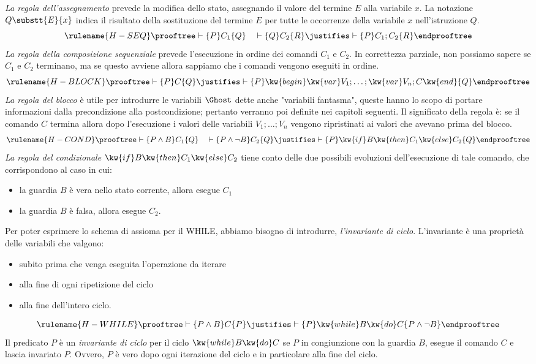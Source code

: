 \emph{La regola dell'assegnamento} prevede la modifica dello stato, assegnando il valore del termine $E$ alla variabile $x$.
La notazione $Q\substt{E}{x}$ indica il risultato della sostituzione del termine $E$
per tutte le occorrenze della variabile $x$ nell'istruzione $Q$.
\[
  \rulename {H-SEQ}
  \prooftree
    \vdash \{P\} C_1\{Q\}
    \quad
    \vdash \{Q\} C_2\{R\}
   \justifies
     \vdash \{P\}C_1;C_2\{R\}
  \endprooftree
\]
\emph{La regola della composizione sequenziale} prevede l'esecuzione in ordine dei comandi $C_1$ e $C_2$.
In correttezza parziale, non possiamo sapere se $C_1$ e $C_2$ terminano,
ma se questo avviene allora sappiamo che i comandi vengono eseguiti in ordine.
\[
  \rulename {H-BLOCK}
  \prooftree
    \vdash \{P\} C\{Q\}
   \justifies
     \vdash \{P\}\kw{begin}\kw{var}V_1;\dots ;\kw{var} V_n;C\kw{end}\{Q\}
  \endprooftree
\]
\emph{La regola del blocco} è utile per introdurre le variabili $\Ghost$ dette anche "variabili fantasma",
queste hanno lo scopo di portare informazioni dalla precondizione alla postcondizione;
pertanto verranno poi definite nei capitoli seguenti.
Il significato della regola è: se il comando $C$ termina allora dopo l'esecuzione
i valori delle variabili $V_1;\dots;V_n$ vengono ripristinati ai valori che avevano prima del blocco.
\[
  \rulename {H-COND}
  \prooftree
    \vdash \{P \land B\} C_1\{Q\}
    \quad
    \vdash \{P \land \neg B\} C_2\{Q\}
   \justifies
     \vdash \{P\}\kw{if} B \kw{then} C_1 \kw{else} C_2\{Q\}
  \endprooftree
\]
\emph{La regola del condizionale} $\kw{if} B \kw{then} C_1 \kw{else} C_2$ tiene conto delle due possibili evoluzioni dell'esecuzione di tale comando, che corrispondono al caso in cui:
\begin{itemize}
    \item
     la guardia $B$ è vera nello stato corrente, allora esegue $C_1$
    \item
     la guardia $B$ è falsa, allora esegue $C_2$.
\end{itemize}

Per poter esprimere lo schema di assioma per il WHILE, abbiamo bisogno di introdurre, \emph{l'invariante di ciclo}.
L'invariante è una proprietà delle variabili che valgono:
\begin{itemize}
    \item
     subito prima che venga eseguita l'operazione da iterare
    \item
     alla fine di ogni ripetizione del ciclo
    \item
     alla fine dell'intero ciclo.
\end{itemize}
\[
  \rulename {H-WHILE}
  \prooftree
    \vdash \{P \land B\} C \{P\}
   \justifies
     \vdash \{P\}\kw{while} B \kw{do} C \{P \land \neg B\}
  \endprooftree
\]
Il predicato $P$ è un \emph{invariante di ciclo} per il ciclo
$\kw{while} B \kw{do} C $ se $P$ in congiunzione con la guardia $B$, esegue il comando $C$ e lascia invariato $P$. Ovvero, $P$ è vero dopo ogni iterazione del ciclo e in particolare alla fine del ciclo.

